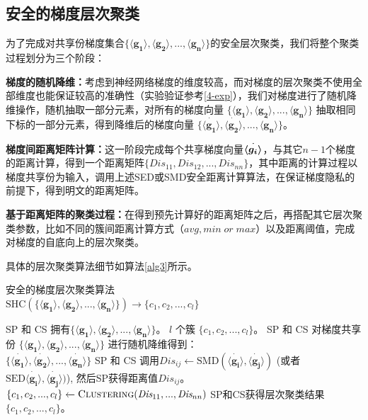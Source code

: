 \subsection{安全的梯度层次聚类}
为了完成对共享份梯度集合$\{\boldsymbol{\langle g_1\rangle}, \boldsymbol{\langle g_2\rangle},...,\boldsymbol{\langle g_n\rangle} \}$的安全层次聚类，我们将整个聚类过程划分为三个阶段：
\begin{compactenum}
	\item \textbf{梯度的随机降维：}考虑到神经网络梯度的维度较高，而对梯度的层次聚类不使用全部维度也能保证较高的准确性（实验验证参考\ref{4-exp}），我们对梯度进行了随机降维操作，随机抽取一部分元素，对所有的梯度向量 $\{\boldsymbol{\langle g_1\rangle}, \boldsymbol{\langle g_2\rangle},...,\boldsymbol{\langle g_n\rangle} \}$ 抽取相同下标的一部分元素，得到降维后的梯度向量 $\{\dot{\boldsymbol{\langle g_1\rangle}}, \dot{\boldsymbol{\langle g_2\rangle}},...,\dot{\boldsymbol{\langle g_n\rangle}} \}$。
	\item \textbf{梯度间距离矩阵计算：}这一阶段完成每个共享梯度向量$\dot{\boldsymbol{\langle g_i\rangle_{}}}$，与其它$n-1$个梯度的距离计算，得到一个距离矩阵$\{\textit{Dis}_{11}, \textit{Dis}_{12},...,\textit{Dis}_{nn}\}$，其中距离的计算过程以梯度共享份为输入，调用上述SED或SMD安全距离计算算法，在保证梯度隐私的前提下，得到明文的距离矩阵。
	\item \textbf{基于距离矩阵的聚类过程：}在得到预先计算好的距离矩阵之后，再搭配其它层次聚类参数，比如不同的簇间距离计算方式（$avg, min\; or\; max$）以及距离阈值，完成对梯度的自底向上的层次聚类。
\end{compactenum}
具体的层次聚类算法细节如算法\ref{alg3}所示。

\begin{algorithm}[htbp]
	\caption{安全的梯度层次聚类算法 \\ $\text{SHC}(\{\boldsymbol{\langle g_1\rangle}, \boldsymbol{\langle g_2\rangle},...,\boldsymbol{\langle g_n\rangle} \}) \rightarrow \{c_1,c_2,...,c_l \}$}
	\label{alg3}
	\begin{algorithmic}[1]
		\REQUIRE SP 和 CS 拥有$\{\boldsymbol{\langle g_1\rangle}, \boldsymbol{\langle g_2\rangle},...,\boldsymbol{\langle g_n\rangle} \}$。 
		\ENSURE $l$ 个簇 $\{c_1,c_2,...,c_l \}$。
		\STATE SP 和 CS 对梯度共享份 $\{\boldsymbol{\langle g_1\rangle}, \boldsymbol{\langle g_2\rangle},...,\boldsymbol{\langle g_n\rangle} \}$ 进行随机降维得到：\\ $\{\dot{\boldsymbol{\langle g_1\rangle}}, \dot{\boldsymbol{\langle g_2\rangle}},...,\dot{\boldsymbol{\langle g_n\rangle}} \}$
			\STATE SP 和 CS 调用$\textit{Dis}_{ij} \xleftarrow{}\text{SMD}(\dot{\boldsymbol{\langle g_i\rangle}}, \dot{\boldsymbol{\langle g_j\rangle}})$ (或者 $\text{SED}\dot{\boldsymbol{\langle g_i\rangle}}, \dot{\boldsymbol{\langle g_j\rangle}})$), 然后SP获得距离值$\textit{Dis}_{ij}$。
		\ENDFOR
		\ENDFOR
		\STATE $\{c_1,c_2,...,c_l \} \xleftarrow{} \textsc{Clustering}(\textit{Dis}_{11},...,\textit{Dis}_{nn})$ 
		\RETURN SP和CS获得层次聚类结果 $\{c_1,c_2,...,c_l \}$。
	\end{algorithmic}
\end{algorithm}


